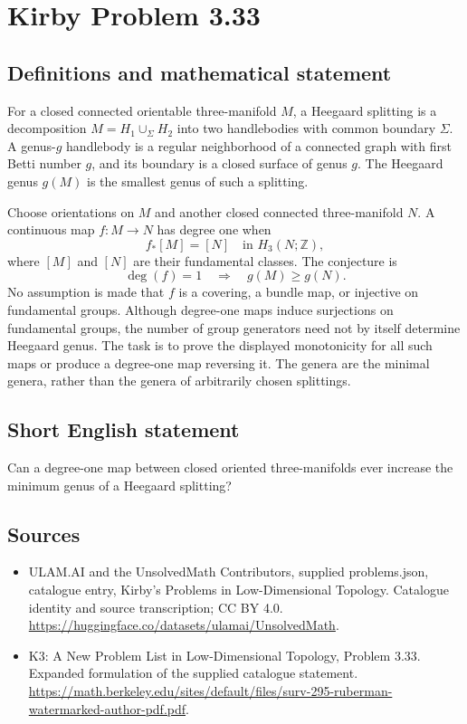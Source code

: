 \documentclass[11pt,a4paper]{article}
\begin{document}
\section*{Kirby Problem 3.33}\label{statement}

\subsection{Definitions and mathematical statement}
For a closed connected orientable three-manifold $M$, a Heegaard splitting
is a decomposition $M=H_1\cup_\Sigma H_2$ into two handlebodies with common
boundary $\Sigma$. A genus-$g$ handlebody is a regular neighborhood of a
connected graph with first Betti number $g$, and its boundary is a closed
surface of genus $g$. The Heegaard genus $g(M)$ is the smallest genus of
such a splitting.

Choose orientations on $M$ and another closed connected three-manifold $N$.
A continuous map $f:M\to N$ has degree one when
\[
 f_*[M]=[N]\quad\text{in }H_3(N;\mathbb Z),
\]
where $[M]$ and $[N]$ are their fundamental classes. The conjecture is
\[
 \deg(f)=1\quad\Longrightarrow\quad g(M)\geq g(N).
\]
No assumption is made that $f$ is a covering, a bundle map, or injective on
fundamental groups. Although degree-one maps induce surjections on
fundamental groups, the number of group generators need not by itself
determine Heegaard genus. The task is to prove the displayed monotonicity
for all such maps or produce a degree-one map reversing it. The genera are
the minimal genera, rather than the genera of arbitrarily chosen splittings.
\subsection{Short English statement}
Can a degree-one map between closed oriented three-manifolds ever increase the minimum genus of a Heegaard splitting?
\subsection{Sources}
\begin{itemize}
\item[S1] ULAM.AI and the UnsolvedMath Contributors, supplied problems.json, catalogue entry, Kirby's Problems in Low-Dimensional Topology. Catalogue identity and source transcription; CC BY 4.0.
\url{https://huggingface.co/datasets/ulamai/UnsolvedMath}.
\item[S2] K3: A New Problem List in Low-Dimensional Topology, Problem 3.33. Expanded formulation of the supplied catalogue statement.
\url{https://math.berkeley.edu/sites/default/files/surv-295-ruberman-watermarked-author-pdf.pdf}.
\end{itemize}
\end{document}
